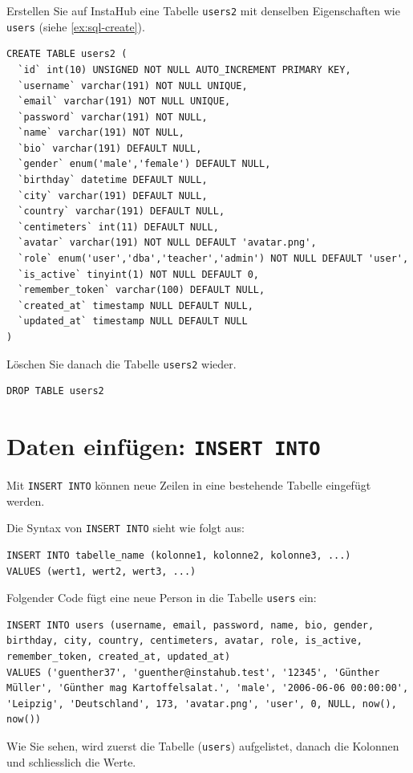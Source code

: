 \begin{myexercise}
  Erstellen Sie auf InstaHub eine Tabelle \texttt{users2} mit denselben Eigenschaften wie \texttt{users} (siehe \cref{ex:sql-create}).
  \begin{myanswer}
    \begin{lstlisting}
CREATE TABLE users2 (
  `id` int(10) UNSIGNED NOT NULL AUTO_INCREMENT PRIMARY KEY,
  `username` varchar(191) NOT NULL UNIQUE,
  `email` varchar(191) NOT NULL UNIQUE,
  `password` varchar(191) NOT NULL,
  `name` varchar(191) NOT NULL,
  `bio` varchar(191) DEFAULT NULL,
  `gender` enum('male','female') DEFAULT NULL,
  `birthday` datetime DEFAULT NULL,
  `city` varchar(191) DEFAULT NULL,
  `country` varchar(191) DEFAULT NULL,
  `centimeters` int(11) DEFAULT NULL,
  `avatar` varchar(191) NOT NULL DEFAULT 'avatar.png',
  `role` enum('user','dba','teacher','admin') NOT NULL DEFAULT 'user',
  `is_active` tinyint(1) NOT NULL DEFAULT 0,
  `remember_token` varchar(100) DEFAULT NULL,
  `created_at` timestamp NULL DEFAULT NULL,
  `updated_at` timestamp NULL DEFAULT NULL
)
\end{lstlisting}
  \end{myanswer}
\end{myexercise}

\begin{myexercise}
  Löschen Sie danach die Tabelle \texttt{users2} wieder.
  \begin{myanswer}
    \begin{lstlisting}
DROP TABLE users2
\end{lstlisting}
  \end{myanswer}
\end{myexercise}


\section{Daten einfügen: \texorpdfstring{\lstinline|INSERT INTO|}{INSERT INTO}}

Mit \lstinline|INSERT INTO| können neue Zeilen in eine bestehende Tabelle eingefügt werden.

Die Syntax von \lstinline|INSERT INTO| sieht wie folgt aus:

\begin{lstlisting}
INSERT INTO tabelle_name (kolonne1, kolonne2, kolonne3, ...)
VALUES (wert1, wert2, wert3, ...)
\end{lstlisting}

\begin{myexample}
\label{ex:sql-insert}
Folgender Code fügt eine neue Person in die Tabelle \texttt{users} ein:
\begin{lstlisting}
INSERT INTO users (username, email, password, name, bio, gender, birthday, city, country, centimeters, avatar, role, is_active, remember_token, created_at, updated_at)
VALUES ('guenther37', 'guenther@instahub.test', '12345', 'Günther Müller', 'Günther mag Kartoffelsalat.', 'male', '2006-06-06 00:00:00', 'Leipzig', 'Deutschland', 173, 'avatar.png', 'user', 0, NULL, now(), now())
\end{lstlisting}
Wie Sie sehen, wird zuerst die Tabelle (\texttt{users}) aufgelistet, danach die Kolonnen und schliesslich die Werte.
\end{myexample}

